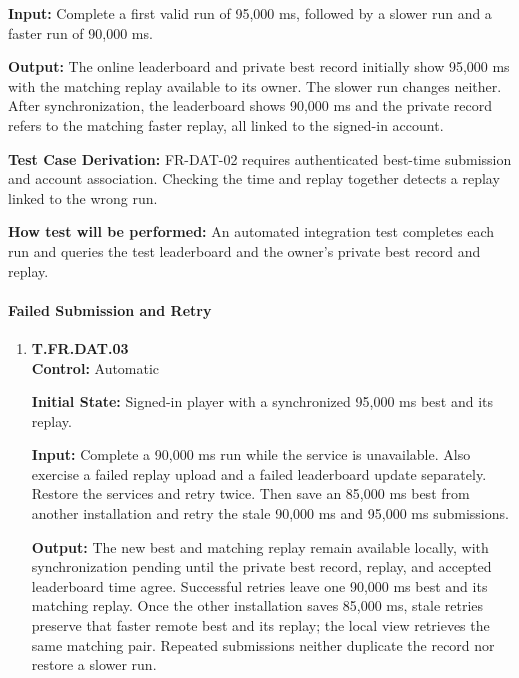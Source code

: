\documentclass[12pt, titlepage]{article}
\begin{document}
{\begin{enumerate}
\textbf{Input:} Complete a first valid run of 95,000 ms, followed by a slower run
and a faster run of 90,000 ms.

\textbf{Output:} The online leaderboard and private best record initially show
95,000 ms with the matching replay available to its owner. The slower run changes
neither. After synchronization, the leaderboard shows 90,000 ms and the private
record refers to the matching faster replay, all linked to the signed-in account.

\textbf{Test Case Derivation:} \mbox{FR-DAT-02} requires authenticated best-time
submission and account association. Checking the time and replay together detects
a replay linked to the wrong run.

\textbf{How test will be performed:} An automated integration test completes each
run and queries the test leaderboard and the owner's private best record and replay.

\end{enumerate}

\paragraph{Failed Submission and Retry}

\begin{enumerate}

\item{\hypertarget{test-fr-da03}{}\textbf{T.FR.DAT.03}\\}
\textbf{Control:} Automatic

\textbf{Initial State:} Signed-in player with a synchronized 95,000 ms best and
its replay.

\textbf{Input:} Complete a 90,000 ms run while the service is unavailable. Also
exercise a failed replay upload and a failed leaderboard update separately. Restore
the services and retry twice. Then save an 85,000 ms best from another installation
and retry the stale 90,000 ms and 95,000 ms submissions.

\textbf{Output:} The new best and matching replay remain available locally, with
synchronization pending until the private best record, replay, and accepted
leaderboard time agree. Successful retries leave one 90,000 ms best and its matching
replay. Once the other installation saves 85,000 ms, stale retries preserve that
faster remote best and its replay; the local view retrieves the same matching pair.
Repeated submissions neither duplicate the record nor restore a slower run.


\end{enumerate}}
\end{document}
